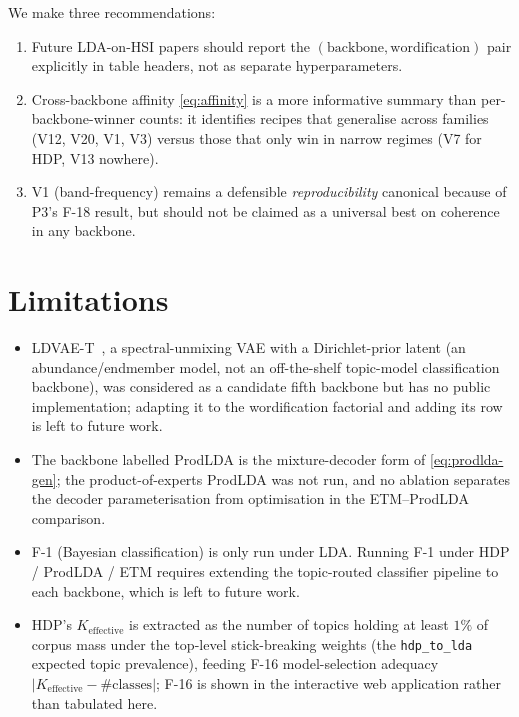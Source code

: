 \documentclass[journal,a4paper,10pt]{IEEEtran}
\begin{document}
We make three recommendations:
\begin{enumerate}
  \item Future LDA-on-HSI papers should report the
    $(\text{backbone}, \text{wordification})$ pair explicitly in
    table headers, not as separate hyperparameters.
  \item Cross-backbone affinity \eqref{eq:affinity} is a more
    informative summary than per-backbone-winner counts: it identifies
    recipes that generalise across families (V12, V20, V1, V3) versus
    those that only win in narrow regimes (V7 for HDP, V13 nowhere).
  \item V1 (band-frequency) remains a defensible \emph{reproducibility}
    canonical because of P3's F-18 result, but should not be claimed
    as a universal best on coherence in any backbone.
\end{enumerate}

\section{Limitations}\label{sec:limitations}

\begin{itemize}
  \item LDVAE-T~\cite{giannetti2025ldvaet}, a spectral-unmixing VAE with
    a Dirichlet-prior latent (an abundance/endmember model, not an
    off-the-shelf topic-model classification backbone), was considered as
    a candidate fifth backbone but has no public implementation; adapting
    it to the wordification factorial and adding its row is left to
    future work.
  \item The backbone labelled ProdLDA is the mixture-decoder form of
    \eqref{eq:prodlda-gen}; the product-of-experts ProdLDA was not run,
    and no ablation separates the decoder parameterisation from
    optimisation in the ETM--ProdLDA comparison.
  \item F-1 (Bayesian classification) is only run under LDA. Running
    F-1 under HDP / ProdLDA / ETM requires extending the topic-routed
    classifier pipeline to each backbone, which is left to future work.
  \item HDP's $K_{\text{effective}}$ is extracted as the number of
    topics holding at least $1\%$ of corpus mass under the top-level
    stick-breaking weights (the \texttt{hdp\_to\_lda} expected topic
    prevalence), feeding F-16 model-selection adequacy
    $|K_{\text{effective}}-\#\text{classes}|$; F-16 is shown in the
    interactive web application rather than tabulated here.
\end{itemize}
\end{document}
